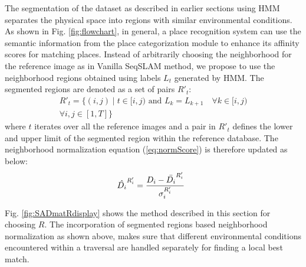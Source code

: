\documentclass[letterpaper, 10 pt, conference]{ieeeconf}  %
\begin{document}
The segmentation of the dataset as described in earlier sections using HMM separates the physical space into regions with similar environmental conditions. As shown in Fig. \ref{fig:flowchart}, in general, a place recognition system can use the semantic information from the place categorization module to enhance its affinity scores for matching places. Instead of arbitrarily choosing the neighborhood for the reference image as in Vanilla SeqSLAM method, we propose to use the neighborhood regions obtained using labels $L_t$ generated by HMM. The segmented regions are denoted as a set of pairs $R'_t$:
\begin{equation}
\begin{split}
 R'_t = \{ (i,j) \mid t\in [i,j) \text{ and } L_{k} = L_{k+1} \quad \forall k \in [i,j) \\
 \forall i,j \in [1,T] \}
\end{split}
\end{equation}
where $t$ iterates over all the reference images and a pair in $R'_t$ defines the lower and upper limit of the segmented region within the reference database. The neighborhood normalization equation (\ref{eq:normScore}) is therefore updated as below: 
\begin{equation}
 \hat{D_i}^{R'_i} = \frac{D_i-\bar{D_i}^{R'_i}}{\sigma_i^{R'_i}} \hspace{0.2cm}
 \label{eq:normScoreNew}
\end{equation}

Fig. \ref{fig:SADmatRdisplay} shows the method described in this section for choosing $R$. The incorporation of segmented regions based neighborhood normalization as shown above, makes sure that different environmental conditions encountered within a traversal are handled separately for finding a local best match.
\end{document}
